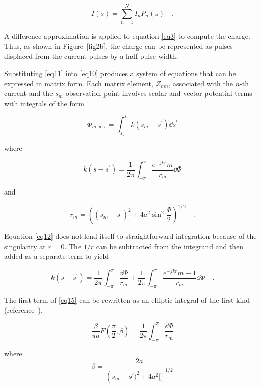 \documentclass[12pt]{article}
\begin{document}
\begin{equation}
I(s) = \sum_{n=1}^{N} I_n P_n (s)
\quad.
\label{eq11}
\end{equation}

A difference approximation is applied to equation \eqref{eq3} to compute
the charge. Thus, as shown in Figure~\ref{fig2b}, the charge can be
represented as pulses displaced from the current pulses by a half pulse
width.

Substituting \eqref{eq11} into \eqref{eq10} produces a system of
equations that can be expressed in matrix form. Each matrix element,
$Z_{mn}$, associated with the $n$-th current and the $s_m$ observation
point involves scalar and vector potential terms with integrals of the
form

\begin{equation}
\Phi_{m,u,v} = \int_{s_u}^{s_v} k(s_m - s^\prime)\dd{s^\prime}
\label{eq12}
\end{equation}

where

\begin{equation}
k(s-s^\prime) = \frac{1}{2\pi}\int_{-\pi}^\pi\frac{e^{-jkr}m}{r_m}\dd{\Phi}
\label{eq13}
\end{equation}

and

\begin{equation}
r_m = \left((s_m - s^\prime)^2 + 4a^2\sin^2\frac{\Phi}{2}\right)^{1/2}
\quad.
\label{eq14}
\end{equation}

Equation \eqref{eq12} does not lend itself to straightforward
integration because of the singularity at $r=0$. The $1/r$ can be
subtracted from the integrand and then added as a separate term to yield

\begin{equation}
k(s-s^\prime) = \frac{1}{2\pi}\int_{-\pi}^\pi \frac{\dd{\Phi}}{r_m}
+\frac{1}{2\pi}\int_{-\pi}^\pi\frac{e^{-jkr}m-1}{r_m}\dd{\Phi}
\quad.
\label{eq15}
\end{equation}

The first term of \eqref{eq15} can be rewritten as an elliptic integral
of the first kind (reference~\cite{r6}).

\begin{equation}
\frac{\beta}{\pi a}F\left(\frac{\pi}{2}, \beta\right) =
\frac{1}{2\pi}\int_{-\pi}^\pi\frac{\dd{\Phi}}{r_m}
\label{eq16}
\end{equation}

where
\[ \beta=\frac{2a}{\left(s_m-s^\prime)^2+4a^2[\right]^{1/2}}
\]
\end{document}
